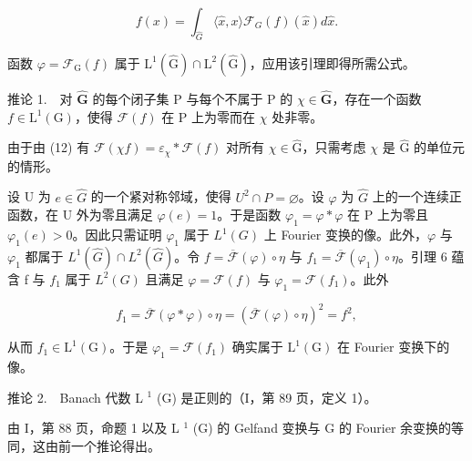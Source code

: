 \[
f (x) = \int_ {\widehat {G}} \langle \widehat {x}, x \rangle \mathcal {F} _ {G} (f) (\widehat {x}) d \widehat {x}.
\]

函数 \(\varphi = \mathcal{F}_{\mathrm{G}}(f)\) 属于 \(\mathrm{L}^1 (\widehat{\mathrm{G}})\cap \mathrm{L}^2 (\widehat{\mathrm{G}})\)，应用该引理即得所需公式。

推论 1.　对 \(\widehat{\mathbf{G}}\) 的每个闭子集 P 与每个不属于 P 的 \(\chi \in \widehat{\mathbf{G}}\)，存在一个函数 \(f \in \mathrm{L}^{1}(\mathrm{G})\)，使得 \(\mathcal{F}(f)\) 在 P 上为零而在 \(\chi\) 处非零。

由于由 (12) 有 \(\mathcal{F}(\chi f) = \varepsilon_{\chi} * \mathcal{F}(f)\) 对所有 \(\chi \in \widehat{\mathrm{G}}\)，只需考虑 \(\chi\) 是 \(\widehat{\mathrm{G}}\) 的单位元的情形。

设 U 为 \(e \in \widehat{G}\) 的一个紧对称邻域，使得 \(U^{2} \cap P = \varnothing\)。设 \(\varphi\) 为 \(\widehat{G}\) 上的一个连续正函数，在 U 外为零且满足 \(\varphi(e) = 1\)。于是函数 \(\varphi_{1} = \varphi * \varphi\) 在 P 上为零且 \(\varphi_{1}(e) > 0\)。因此只需证明 \(\varphi_{1}\) 属于 \(L^{1}(G)\) 上 Fourier 变换的像。此外，\(\varphi\) 与 \(\varphi_{1}\) 都属于 \(L^{1}(\widehat{G}) \cap L^{2}(\widehat{G})\)。令 \(f = \overline{\mathcal{F}}(\varphi) \circ \eta\) 与 \(f_{1} = \overline{\mathcal{F}}(\varphi_{1}) \circ \eta\)。引理 6 蕴含 f 与 \(f_{1}\) 属于 \(L^{2}(G)\) 且满足 \(\varphi = \mathcal{F}(f)\) 与 \(\varphi_{1} = \mathcal{F}(f_{1})\)。此外

\[
f _ {1} = \overline {{\mathcal {F}}} (\varphi * \varphi) \circ \eta = (\overline {{\mathcal {F}}} (\varphi) \circ \eta) ^ {2} = f ^ {2},
\]

从而 \(f_{1} \in \mathrm{L}^{1}(\mathrm{G})\)。于是 \(\varphi_{1} = \mathcal{F}(f_{1})\) 确实属于 \(\mathrm{L}^{1}(\mathrm{G})\) 在 Fourier 变换下的像。

推论 2.　Banach 代数 L \(^{1}\) (G) 是正则的（I，第 89 页，定义 1）。

由 I，第 88 页，命题 1 以及 L \(^{1}\) (G) 的 Gelfand 变换与 G 的 Fourier 余变换的等同，这由前一个推论得出。
